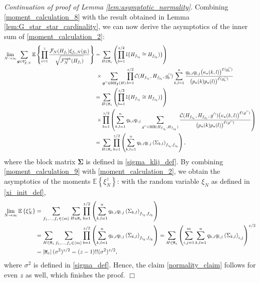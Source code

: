 \documentclass[11pt,reqno]{amsart}
\numberwithin{equation}{section}
\newcommand{\abs}[1]{\left\lvert #1 \right\rvert}
\newcommand{\sprod}[1]{\langle#1\rangle}
\newcommand{\E}[1]{\mathbb{E}\left\{ #1\right\}}
\newcommand{\nelem}[1]{{Lemma \ref{#1}}}
\newcommand{\QED}{\hfill $\Box$}
\newcommand{\kb}[1]{\boldsymbol{#1}}
\newcommand{\vk}[1]{\kb{#1}}
\begin{document}
\noindent
{{\it Continuation of proof of \nelem{lem:asymptotic_normality}}.} Combining \eqref{moment_calculation_8} with {the result obtained in} \nelem{lem:G_star_star_cardinality}, we {can now derive the asymptotics of the inner sum of \eqref{moment_calculation_2}:} 
\begin{align}
    {\lim_{N\to\infty}}\sum_{\vk g\in{\tt G}^{\star}_{\vk f,N}}\E{\prod_{i=1}^{z}\frac{\mathcal{F}_{{N}}({H}_{f_i})\xi_{f_i,{N}}(g_i)}{\sqrt{\mathcal{F}^{\rm opt}_N({H}_{f_i})}}}&=\sum_{{H}\in{\tt M}_z} \left(\prod_{b=1}^{z/2}\mathbb{I}\{{H}_{f_{i_b}}\cong {H}_{f_{j_b}})\}\right) \notag\\
    &\qquad\hspace{-0.6cm}\times\sum_{\vk g^{\cap}\in{\tt OCS}_{\vk f}({H})}\prod_{b=1}^{z/2}\mathcal{C}({H}_{f_{i_b}},{H}_{f_{j_b}},g^{\cap}_{b})\sum_{k,l=1}^{n}\frac{q_{k,i}q_{l,j}\bigl(\kappa_{\star}(k,l)\bigr)^{\mathcal{E}(g_b^{\cap})}}{\bigl(p_{\star}(k)p_{\star}(l)\bigr)^{\mathcal{E}(g_b^{\cap})}}\notag\\
    &= \sum_{{H}\in{\tt M}_z} \left(\prod_{b=1}^{z/2}\mathbb{I}\{{H}_{f_{i_b}}\cong {H}_{f_{j_b}})\}\right) \notag\\
    &\qquad\hspace{-0.6cm}\times\prod_{b=1}^{z/2}\left(\sum_{k,l=1}^{n}q_{k,i}q_{l.j}\sum_{g^{\cap}\in{\tt OCS}({H}_{f_{i_b}},{H}_{f_{j_b}})}\frac{\mathcal{C}({H}_{f_{i_b}},{H}_{f_{j_b}},g^{\cap})\bigl(\kappa_{\star}(k,l)\bigr)^{\mathcal{E}(g^{\cap})}}{\bigl(p_{\star}(k)p_{\star}(l)\bigr)^{\mathcal{E}(g^{\cap})}}\right)\notag\\
    &=\sum_{{H}\in{\tt M}_z}\prod_{b=1}^{z/2}\left(\sum_{k,l=1}^{n}q_{k,i}q_{l.j}\left(\Sigma_{k,l}\right)_{f_{i_b},f_{j_b}}\right),\label{moment_calculation_9}
\end{align}
where the block matrix $\vk{\Sigma}$ is defined in \eqref{sigma_klij_def}.
{By combining \eqref{moment_calculation_9} with \eqref{moment_calculation_2}, we obtain the asymptotics of the moments $\E{\xi_{{N}}^z}$: with the random variable $\xi_{{N}}$ as defined in \eqref{xi_init_def},}
\begin{align*}
    \lim_{N\to\infty}\E{\xi_{{N}}^z} &= \sum_{f_1,\ldots,f_{z}\in\sprod{m}}\sum_{{H}\in{\tt M}_z}\prod_{b=1}^{z/2}\left(\sum_{k,l=1}^{n}q_{k,i}q_{l.j}\left(\Sigma_{k,l}\right)_{f_{i_b},f_{j_b}}\right)\\
    &= \sum_{{H}\in{\tt M}_z}\sum_{f_1,\ldots,f_{z}\in\sprod{m}}\prod_{b=1}^{z/2}\left(\sum_{k,l=1}^{n}q_{k,i}q_{l.j}\left(\Sigma_{k,l}\right)_{f_{i_b},f_{j_b}}\right)=\sum_{{H}\in{\tt M}_z}\left(\sum_{i,j=1}^{m}\sum_{k,l=1}^{n}q_{k,i}q_{l,j}\left(\Sigma_{k,l}\right)_{i,j}\right)^{z/2}\\
    &=\abs{{\tt M}_z}(\sigma^2)^{z/2}=(z-1)!!(\sigma^2)^{z/2},
\end{align*}
where $\sigma^2$ is defined in \eqref{sigma_def}. Hence, the claim \eqref{normality_claim} follows for even $z$ as well, which finishes the proof.
\QED
\end{document}
